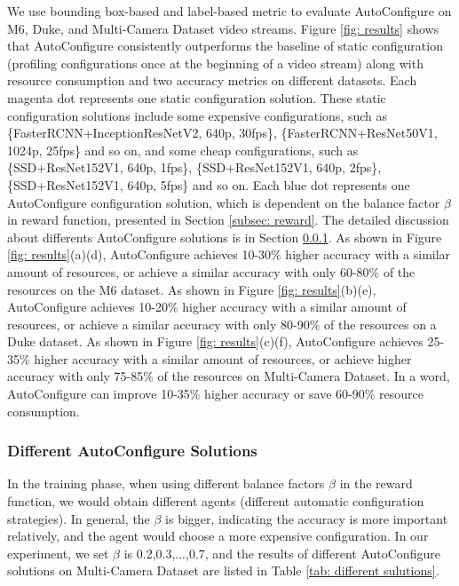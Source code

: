 We use bounding box-based and label-based metric to evaluate AutoConfigure on M6, Duke, and Multi-Camera Dataset video streams. Figure \ref{fig: results} shows that AutoConfigure consistently outperforms the baseline of static configuration (profiling configurations once at the beginning of a video stream) along with resource consumption and two accuracy metrics on different datasets. Each magenta dot represents one static configuration solution. These static configuration solutions include some expensive configurations, such as \{FasterRCNN+InceptionResNetV2, 640p, 30fps\}, \{FasterRCNN+ResNet50V1, 1024p, 25fps\} and so on, and some cheap configurations, such as \{SSD+ResNet152V1, 640p, 1fps\}, \{SSD+ResNet152V1, 640p, 2fps\}, \{SSD+ResNet152V1, 640p, 5fps\} and so on. Each blue dot represents one AutoConfigure configuration solution, which is dependent on the balance factor $\beta$ in reward function, presented in Section \ref{subsec: reward}. The detailed discussion about differents AutoConfigure solutions is in Section \ref{subsec: different sulutions}. As shown in Figure \ref{fig: results}(a)(d), AutoConfigure achieves 10-30\% higher accuracy with a similar amount of resources, or achieve a similar accuracy with only 60-80\% of the resources on the M6 dataset. As shown in Figure \ref{fig: results}(b)(e), AutoConfigure achieves 10-20\% higher accuracy with a similar amount of resources, or achieve a similar accuracy with only 80-90\% of the resources on a Duke dataset. As shown in Figure \ref{fig: results}(c)(f), AutoConfigure achieves 25-35\% higher accuracy with a similar amount of resources, or achieve higher accuracy with only 75-85\% of the resources on Multi-Camera Dataset. In a word, AutoConfigure can improve 10-35\% higher accuracy or save 60-90\% resource consumption.

\subsubsection{Different AutoConfigure Solutions}
\label{subsec: different sulutions}
In the training phase, when using different balance factors $\beta$ in the reward function, we would obtain different agents (different automatic configuration strategies). In general, the $\beta$ is bigger, indicating the accuracy is more important relatively, and the agent would choose a more expensive configuration. In our experiment, we set $\beta$ is 0.2,0.3,...,0.7, and the results of different AutoConfigure solutions on Multi-Camera Dataset are listed in Table \ref{tab: different sulutions}.

